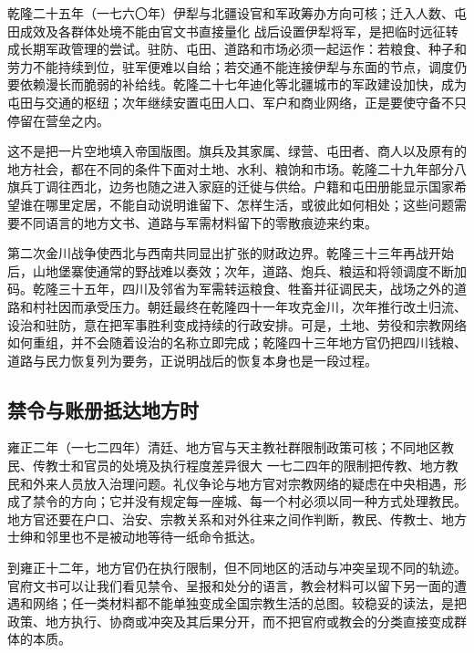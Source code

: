 \begin{event}{}{乾隆二十五年（一七六〇年）}{伊犁与北疆}{设官和军政筹办方向可核；迁入人数、屯田成效及各群体处境不能由官文书直接量化}
战后设置伊犁将军，是把临时远征转成长期军政管理的尝试。驻防、屯田、道路和市场必须一起运作：若粮食、种子和劳力不能持续到位，驻军便难以自给；若交通不能连接伊犁与东面的节点，调度仍要依赖漫长而脆弱的补给线。乾隆二十七年迪化等北疆城市的军政建设加快，成为屯田与交通的枢纽；次年继续安置屯田人口、军户和商业网络，正是要使守备不只停留在营垒之内。

这不是把一片空地填入帝国版图。旗兵及其家属、绿营、屯田者、商人以及原有的地方社会，都在不同的条件下面对土地、水利、粮饷和市场。乾隆二十九年部分八旗兵丁调往西北，边务也随之进入家庭的迁徙与供给。户籍和屯田册能显示国家希望谁在哪里定居，不能自动说明谁留下、怎样生活，或彼此如何相处；这些问题需要不同语言的地方文书、道路与军需材料留下的零散痕迹来约束。
\end{event}

第二次金川战争使西北与西南共同显出扩张的财政边界。乾隆三十三年再战开始后，山地堡寨使通常的野战难以奏效；次年，道路、炮兵、粮运和将领调度不断加码。乾隆三十五年，四川及邻省为军需转运粮食、牲畜并征调民夫，战场之外的道路和村社因而承受压力。朝廷最终在乾隆四十一年攻克金川，次年推行改土归流、设治和驻防，意在把军事胜利变成持续的行政安排。可是，土地、劳役和宗教网络如何重组，并不会随着设治的名称立即完成；乾隆四十三年地方官仍把四川钱粮、道路与民力恢复列为要务，正说明战后的恢复本身也是一段过程。

\subsection{禁令与账册抵达地方时}

\begin{event}{}{雍正二年（一七二四年）}{清廷、地方官与天主教社群}{限制政策可核；不同地区教民、传教士和官员的处境及执行程度差异很大}
一七二四年的限制把传教、地方教民和外来人员放入治理问题。礼仪争论与地方官对宗教网络的疑虑在中央相遇，形成了禁令的方向；它并没有规定每一座城、每一个村必须以同一种方式处理教民。地方官还要在户口、治安、宗教关系和对外往来之间作判断，教民、传教士、地方士绅和邻里也不是被动地等待一纸命令抵达。

到雍正十二年，地方官仍在执行限制，但不同地区的活动与冲突呈现不同的轨迹。官府文书可以让我们看见禁令、呈报和处分的语言，教会材料可以留下另一面的遭遇和网络；任一类材料都不能单独变成全国宗教生活的总图。较稳妥的读法，是把政策、地方执行、协商或冲突及其后果分开，而不把官府或教会的分类直接变成群体的本质。
\end{event}

